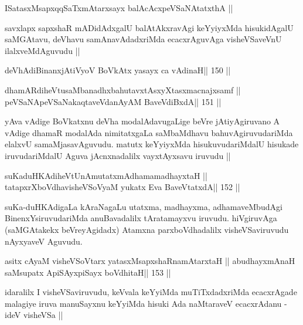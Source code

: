 
\begin{shl}
ISatasxMsapxqqSaTxmAtarxsayx balAcAcx\s\s peVSaNAtatxthA ||
\end{shl}

\begin{artha}
savxlapx sapxshaR mADidAdxgalU balAtAkxravAgi keYyiyxMda hisukidAgalU 
saMGAtavu, deVhavu samAnavAdadxriMda ecacxrAguvAga visheVSaveVnU ilalxveMdAguvudu ||
\end{artha}

\begin{shl}
deVhAdiBinanxjAtiVyoV BoVkAtx yasayx ca vAdinaH\hfill || 150 ||
\end{shl}

\begin{shl}
dhamARdiheVtusaMbanadhxbahutavxtAsxyXtasxmacnajxsamf ||
peVSaNApeVSaNakaqtaveVdanAyAM BaveVdiBxdA\hfill || 151 ||
\end{shl}

\begin{artha}
yAva vAdige BoVkatxnu deVha modalAdavugaLige beVre jAtiyAgiruvano A 
vAdige dhamaR modalAda nimitatxgaLa saMbaMdhavu bahuvAgiruvudariMda 
elalxvU samaMjasavAguvudu. matutx keYyiyxMda hisukuvudariMdalU  
hisukade iruvudariMdalU Aguva jAcnxnadalilx vayxtAyxsavu iruvudu ||
\end{artha}


\begin{shl}
suKaduHKAdiheVtUnAmutatxmAdhamamadhayxtaH ||
tatapxrXboVdhavisheVSoV\s yaM yukatx Eva BaveVtatxdA\hfill || 152 ||
\end{shl}

\begin{artha}
suKa-duHKAdigaLa kAraNagaLu utatxma, madhayxma, adhamaveMbudAgi 
BinenxYsiruvudariMda anuBavadalilx tAratamayxvu iruvudu. hiVgiruvAga (saMGAtakekx beVreyAgidadx) Atamxna parxboVdhadalilx visheVSaviruvudu nAyxyaveV Aguvudu.
\end{artha}


\begin{shl}
asitx cAyaM visheVSoV\s tarx yatasxMsapxshaRnamAtarxtaH ||
abudhayxmAnaH saMsupatx ApiSAyx\s\s piSayx boVdhitaH\hfill || 153 ||
\end{shl}

\begin{artha}
idaralilx I visheVSaviruvudu, keVvala keYyiMda muTiTxdadxriMda 
ecacxrAgade malagiye iruva manuSayxnu keYyiMda hisuki Ada naMtaraveV ecacxrAdanu - ideV visheVSa ||
\end{artha}

